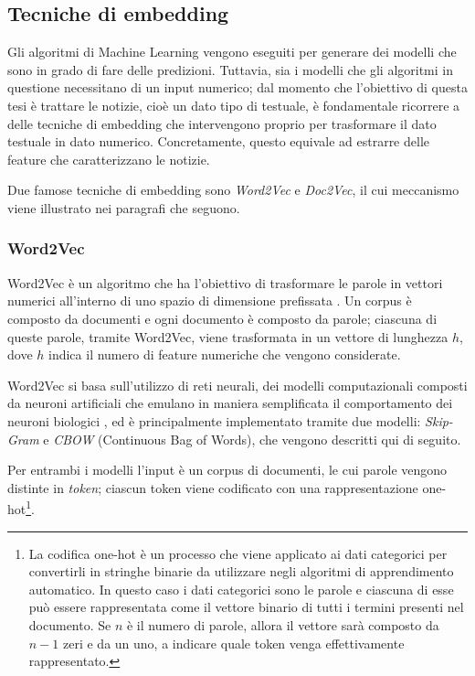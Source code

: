 \documentclass[12pt]{report}
\theoremstyle{definition}
\begin{document}
\subsection{Tecniche di embedding} \label{embedding}
Gli algoritmi di Machine Learning vengono eseguiti per generare dei modelli che sono in grado di fare delle predizioni. Tuttavia, sia i modelli che gli algoritmi in questione necessitano di un input numerico; dal momento che l'obiettivo di questa tesi è trattare le notizie, cioè un dato tipo di testuale, è fondamentale ricorrere a delle tecniche di embedding che intervengono proprio per trasformare il dato testuale in dato numerico.
Concretamente, questo equivale ad estrarre delle feature che caratterizzano le notizie.

Due famose tecniche di embedding sono \textit{Word2Vec} e \textit{Doc2Vec}, il cui meccanismo viene illustrato nei paragrafi che seguono.
\subsubsection{Word2Vec} \label{w2v}
Word2Vec è un algoritmo che ha l'obiettivo di trasformare le parole in vettori numerici all'interno di uno spazio  di dimensione prefissata \cite{3}.
Un corpus è composto da documenti e ogni documento è composto da parole; ciascuna di queste parole, tramite Word2Vec, viene trasformata in un vettore di lunghezza $h$, dove $h$ indica il numero di feature numeriche che vengono considerate. 

Word2Vec si basa sull'utilizzo di reti neurali, dei modelli computazionali composti da neuroni artificiali che emulano in maniera semplificata il comportamento dei neuroni biologici \cite{38}, ed è principalmente implementato tramite due modelli: \textit{Skip-Gram} e \textit{CBOW} (Continuous Bag of Words), che vengono descritti qui di seguito.

Per entrambi i modelli l'input è un corpus di documenti, le cui parole vengono distinte in \textit{token}; ciascun token viene codificato con una rappresentazione one-hot\footnote{La codifica one-hot è un processo che viene applicato ai dati categorici per convertirli in stringhe binarie da utilizzare negli algoritmi di apprendimento automatico. In questo caso i dati categorici sono le parole e ciascuna di esse può essere rappresentata come il vettore binario di tutti i termini presenti nel documento. Se $n$ è il numero di parole, allora il vettore sarà composto da $n-1$ zeri e da un uno, a indicare quale token venga effettivamente rappresentato.}.
\end{document}
